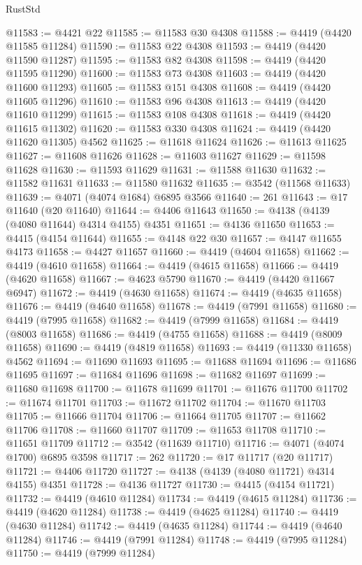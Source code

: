 \begin{lexlean}{RustStd}
\begin{coremodule}
@11583 := @4421 @22
@11585 := @11583 @30 @4308
@11588 := @4419 (@4420 @11585 @11284)
@11590 := @11583 @22 @4308
@11593 := @4419 (@4420 @11590 @11287)
@11595 := @11583 @82 @4308
@11598 := @4419 (@4420 @11595 @11290)
@11600 := @11583 @73 @4308
@11603 := @4419 (@4420 @11600 @11293)
@11605 := @11583 @151 @4308
@11608 := @4419 (@4420 @11605 @11296)
@11610 := @11583 @96 @4308
@11613 := @4419 (@4420 @11610 @11299)
@11615 := @11583 @108 @4308
@11618 := @4419 (@4420 @11615 @11302)
@11620 := @11583 @330 @4308
@11624 := @4419 (@4420 @11620 @11305) @4562
@11625 := @11618 @11624
@11626 := @11613 @11625
@11627 := @11608 @11626
@11628 := @11603 @11627
@11629 := @11598 @11628
@11630 := @11593 @11629
@11631 := @11588 @11630
@11632 := @11582 @11631
@11633 := @11580 @11632
@11635 := @3542 (@11568 @11633)
@11639 := @4071 (@4074 @1684) @6895 @3566
@11640 := 261
@11643 := @17 @11640 (@20 @11640)
@11644 := @4406 @11643
@11650 := @4138 (@4139 (@4080 @11644) @4314 @4155) @4351
@11651 := @4136 @11650
@11653 := @4415 (@4154 @11644)
@11655 := @4148 @22 @30
@11657 := @4147 @11655 @4173
@11658 := @4427 @11657
@11660 := @4419 (@4604 @11658)
@11662 := @4419 (@4610 @11658)
@11664 := @4419 (@4615 @11658)
@11666 := @4419 (@4620 @11658)
@11667 := @4623 @5790
@11670 := @4419 (@4420 @11667 @6947)
@11672 := @4419 (@4630 @11658)
@11674 := @4419 (@4635 @11658)
@11676 := @4419 (@4640 @11658)
@11678 := @4419 (@7991 @11658)
@11680 := @4419 (@7995 @11658)
@11682 := @4419 (@7999 @11658)
@11684 := @4419 (@8003 @11658)
@11686 := @4419 (@4755 @11658)
@11688 := @4419 (@8009 @11658)
@11690 := @4419 (@4819 @11658)
@11693 := @4419 (@11330 @11658) @4562
@11694 := @11690 @11693
@11695 := @11688 @11694
@11696 := @11686 @11695
@11697 := @11684 @11696
@11698 := @11682 @11697
@11699 := @11680 @11698
@11700 := @11678 @11699
@11701 := @11676 @11700
@11702 := @11674 @11701
@11703 := @11672 @11702
@11704 := @11670 @11703
@11705 := @11666 @11704
@11706 := @11664 @11705
@11707 := @11662 @11706
@11708 := @11660 @11707
@11709 := @11653 @11708
@11710 := @11651 @11709
@11712 := @3542 (@11639 @11710)
@11716 := @4071 (@4074 @1700) @6895 @3598
@11717 := 262
@11720 := @17 @11717 (@20 @11717)
@11721 := @4406 @11720
@11727 := @4138 (@4139 (@4080 @11721) @4314 @4155) @4351
@11728 := @4136 @11727
@11730 := @4415 (@4154 @11721)
@11732 := @4419 (@4610 @11284)
@11734 := @4419 (@4615 @11284)
@11736 := @4419 (@4620 @11284)
@11738 := @4419 (@4625 @11284)
@11740 := @4419 (@4630 @11284)
@11742 := @4419 (@4635 @11284)
@11744 := @4419 (@4640 @11284)
@11746 := @4419 (@7991 @11284)
@11748 := @4419 (@7995 @11284)
@11750 := @4419 (@7999 @11284)

\end{coremodule}
\end{lexlean}
